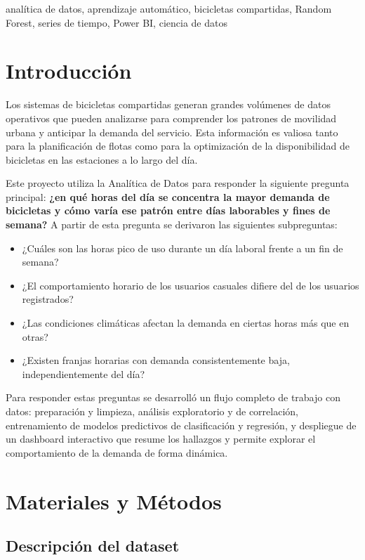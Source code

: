 \documentclass[conference]{IEEEtran}
\begin{document}
\begin{IEEEkeywords}
analítica de datos, aprendizaje automático, bicicletas compartidas, Random Forest, series de tiempo, Power BI, ciencia de datos
\end{IEEEkeywords}

\section{Introducción}

Los sistemas de bicicletas compartidas generan grandes volúmenes de datos operativos que pueden analizarse para comprender los patrones de movilidad urbana y anticipar la demanda del servicio. Esta información es valiosa tanto para la planificación de flotas como para la optimización de la disponibilidad de bicicletas en las estaciones a lo largo del día.

Este proyecto utiliza la Analítica de Datos para responder la siguiente pregunta principal: \textbf{¿en qué horas del día se concentra la mayor demanda de bicicletas y cómo varía ese patrón entre días laborables y fines de semana?} A partir de esta pregunta se derivaron las siguientes subpreguntas:

\begin{itemize}
\item ¿Cuáles son las horas pico de uso durante un día laboral frente a un fin de semana?
\item ¿El comportamiento horario de los usuarios casuales difiere del de los usuarios registrados?
\item ¿Las condiciones climáticas afectan la demanda en ciertas horas más que en otras?
\item ¿Existen franjas horarias con demanda consistentemente baja, independientemente del día?
\end{itemize}

Para responder estas preguntas se desarrolló un flujo completo de trabajo con datos: preparación y limpieza, análisis exploratorio y de correlación, entrenamiento de modelos predictivos de clasificación y regresión, y despliegue de un dashboard interactivo que resume los hallazgos y permite explorar el comportamiento de la demanda de forma dinámica.

\section{Materiales y Métodos}

\subsection{Descripción del dataset}
\end{document}
